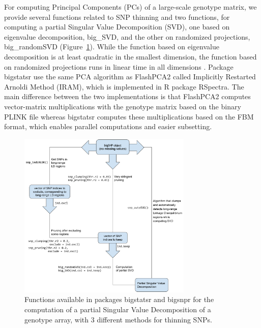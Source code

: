 \documentclass{bioinfo}
\begin{document}
\begin{methods}
For computing Principal Components (PCs) of a large-scale genotype matrix, we provide several functions related to SNP thinning and two functions, for computing a partial Singular Value Decomposition (SVD), one based on eigenvalue decomposition, big\_SVD, and the other on randomized projections, big\_randomSVD (Figure~\ref{fig:svd}). While the function based on eigenvalue decomposition is at least quadratic in the smallest dimension, the function based on randomized projections runs in linear time in all dimensions \cite[]{Lehoucq1996}. Package bigstatsr use the same PCA algorithm as FlashPCA2 called Implicitly Restarted Arnoldi Method (IRAM), which is implemented in R package RSpectra. The main difference between the two implementations is that FlashPCA2 computes vector-matrix multiplications with the genotype matrix based on the binary PLINK file whereas bigstatsr computes these multiplications based on the FBM format, which enables parallel computations and easier subsetting. 

\begin{figure}[!tpb]
\centerline{\includegraphics[width=235pt]{svd.pdf}}
\caption{Functions available in packages bigstatsr and bigsnpr for the computation of a partial Singular Value Decomposition of a genotype array, with 3 different methods for thinning SNPs.}\label{fig:svd}
\end{figure}
 

\end{methods}
\end{document}
